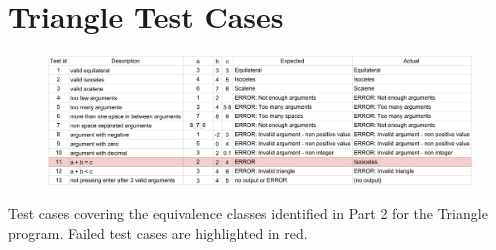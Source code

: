 \documentclass[letterpaper]{article}
\begin{document}
\section{Triangle Test Cases} \label{triangletestcases}
% 
\begin{table}[H]
    \begin{figure}[H]
        \centering
        \includegraphics[width=1.1\textwidth]{triangletable.png}
    \end{figure}
    \caption{Test cases covering the equivalence classes identified in Part 2 for the Triangle program. Failed test cases are highlighted in red.}
\end{table}
\end{document}
